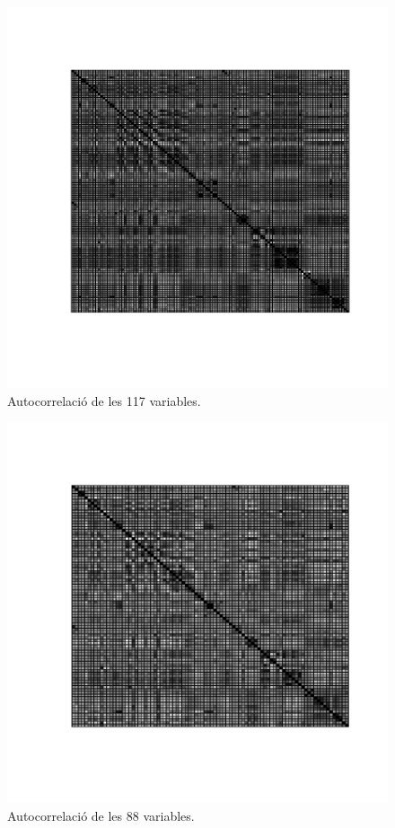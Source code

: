 \documentclass[a4paper,10pt]{article}
\begin{document}
\begin{center}
\begin{figure}
\includegraphics[width=5in]{memoria-autoc}
\caption{Autocorrelació de les 117 variables.} \label{fig:autoc}
\end{figure}
\end{center}

\begin{center}
\begin{figure}
\includegraphics[width=5in]{memoria-autoc_clean}
\caption{Autocorrelació de les 88 variables.} \label{fig:_clean}
\end{figure}
\end{center}
\end{document}
